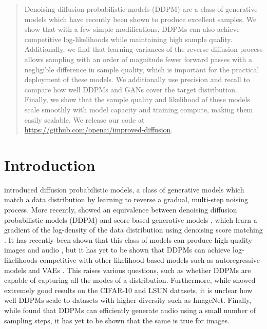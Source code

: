 \documentclass{article}
\begin{document}
\begin{abstract}
Denoising diffusion probabilistic models (DDPM) are a class of generative models which have recently been shown to produce excellent samples. We show that with a few simple modifications, DDPMs can also achieve competitive log-likelihoods while maintaining high sample quality. Additionally, we find that learning variances of the reverse diffusion process allows sampling with an order of magnitude fewer forward passes with a negligible difference in sample quality, which is important for the practical deployment of these models. We additionally use precision and recall to compare how well DDPMs and GANs cover the target distribution. Finally, we show that the sample quality and likelihood of these models scale smoothly with model capacity and training compute, making them easily scalable. We release our code at {\small \url{https://github.com/openai/improved-diffusion}}.
\end{abstract}

\section{Introduction}

\citet{diffusion} introduced diffusion probabilistic models, a class of generative models which match a data distribution by learning to reverse a gradual, multi-step noising process. More recently, \citet{ddpm} showed an equivalence between denoising diffusion probabilistic models (DDPM) and score based generative models \citep{scorematching,improvedscore}, which learn a gradient of the log-density of the data distribution using denoising score matching \citep{hyverianscorematching}. It has recently been shown that this class of models can produce high-quality images \citep{ddpm,improvedscore,adversarial} and audio \citep{wavegrad,diffwave}, but it has yet to be shown that DDPMs can achieve log-likelihoods competitive with other likelihood-based models such as autoregressive models \citep{pixelcnn} and VAEs \citep{vae}. This raises various questions, such as whether DDPMs are capable of capturing all the modes of a distribution. Furthermore, while \citet{ddpm} showed extremely good results on the CIFAR-10 \citep{cifar10} and LSUN \citep{lsun} datasets, it is unclear how well DDPMs scale to datasets with higher diversity such as ImageNet. Finally, while \citet{wavegrad} found that DDPMs can efficiently generate audio using a small number of sampling steps, it has yet to be shown that the same is true for images.
\end{document}
